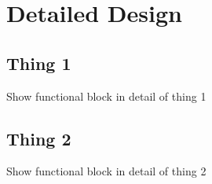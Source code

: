 \graphicspath{{Detailed\_Design/fig}}
\chapter{Detailed Design}
\label{chap:Detailed_Design}

\section{Thing 1}
Show functional block in detail of thing 1
\section{Thing 2}
Show functional block in detail of thing 2

